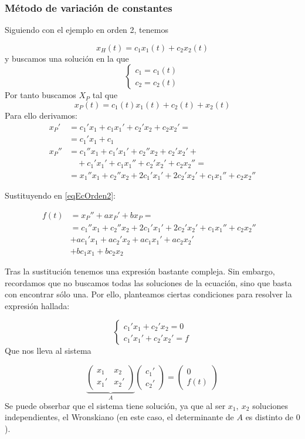 \documentclass{mathnotes}
\begin{document}
\subsubsection{Método de variación de constantes}
\label{secMetodoVarConst}

Siguiendo con el ejemplo en orden 2, tenemos 

\[ x_H (t) = c_1x_1(t) + c_2x_2(t) \]
y buscamos una solución en la que
$$
\left\lbrace
\begin{array}{l}
c_1 = c_1(t)\\
c_2 = c_2(t)
\end{array}
\right. 
$$
Por tanto buscamos $X_P$ tal que
\[ x_P(t) = c_1(t)x_1(t) + c_2(t) + x_2(t) \] Para ello derivamos:
\begin{align*}
x_P'&= c_1'x_1 + c_1x_1' + c_2'x_2 + c_2x_2' = \\
	&= c_1'x_1 + c_1 \\
x_P'' 	&= c_1''x_1+c_1'x_1' + c_2''x_2+c_2'x_2' + \\ 
		&\quad+ c_1'x_1'+c_1x_1'' + c_2'x_2' + c_2x_2'' = \\
		&= x_1''x_1 + c_2''x_2+2c_1'x_1'+2c_2'x_2' + c_1x_1'' +c_2x_2'' 
\end{align*}

Sustituyendo en \eqref{eqEcOrden2}:

\begin{align*}
f(t) &= x_P'' + ax_P' + bx_P = &  \\
	&= c_1''x_1 + c_2''x_2 + 2c_1'x_1' + 2c_2'x_2'  + c_1x_1''  + c_2x_2'' \\
	& + ac_1' x_1 + ac_2'x_2  + ac_1x_1'  + ac_2x_2' \\
	&  + bc_1x_1  + bc_2x_2 
\end{align*}

Tras la sustitución tenemos una expresión bastante compleja. Sin embargo, recordamos que no buscamos todas las soluciones de la ecuación, sino que basta con encontrar sólo una. Por ello, planteamos ciertas condiciones para resolver la expresión hallada:

$$ \left\lbrace \begin{array}{l}
c_1'x_1 + c_2'x_2 = 0 \\  
c_1'x_1' + c_2'x_2' = f
\end{array} \right. $$
Que nos lleva al sistema

\[ \underbrace{\begin{pmatrix}
x_1 & x_2 \\
x_1' & x_2' 
\end{pmatrix}}_A\begin{pmatrix}
c_1' \\ c_2'
\end{pmatrix} = \begin{pmatrix}
0 \\ f(t)
\end{pmatrix} \] 
Se puede obserbar que el sistema tiene solución, ya que al ser $x_1,\ x_2$ soluciones independientes, el Wronskiano (en este caso, el determinante de $A$ es distinto de $0$).
\end{document}
